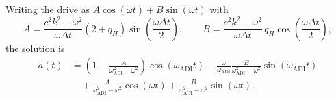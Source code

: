\documentclass{article}
\numberwithin{figure}{section}
\begin{document}
Writing the drive as $A\cos(\omega t)+B\sin(\omega t)$ with
\begin{equation}
    A=\frac{c^2k^2-\omega^2}{\omega\Delta t}(2+q_H)\sin\left(\frac{\omega\Delta t}{2}\right),\qquad
    B=\frac{c^2k^2-\omega^2}{\omega\Delta t}\,q_H\cos\left(\frac{\omega\Delta t}{2}\right),
    \label{eq:mms-h-mid2-AB}
\end{equation}
the solution is
\begin{equation}
    \begin{aligned}
        a(t)
         & =\left(1-\frac{A}{\omega_{\mathrm{ADI}}^2-\omega^2}\right)\cos(\omega_{\mathrm{ADI}}t)
        -\frac{\omega}{\omega_{\mathrm{ADI}}}\frac{B}{\omega_{\mathrm{ADI}}^2-\omega^2}\sin(\omega_{\mathrm{ADI}}t) \\
         & \quad+\frac{A}{\omega_{\mathrm{ADI}}^2-\omega^2}\cos(\omega t)
        +\frac{B}{\omega_{\mathrm{ADI}}^2-\omega^2}\sin(\omega t).
    \end{aligned}
    \label{eq:mms-h-solution-mid2}
\end{equation}
\end{document}
